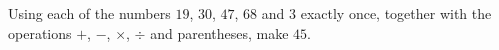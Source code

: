 Using each of the numbers $19$, $30$, $47$, $68$ and $3$ exactly once, together with the operations $+$, $-$, $\times$, $\div$ and parentheses, make $45$.
